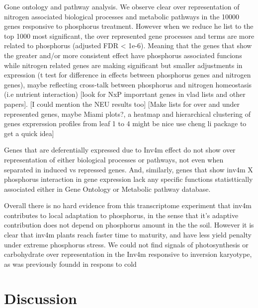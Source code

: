 Gone ontology and pathway analysis. 
We observe clear over representation of nitrogen associated biological processes and metabolic pathways in  the 10000 genes responsive to phosphorus treatment.
However when we reduce he list to the top 1000 most significant, the over represented gene processes and terms are more related to phosphorus (adjusted FDR < 1e-6). 
Meaning that the genes that show the greater and/or more consistent effect  have phosphorus associated funcions while nitrogen related genes are making significant but smaller adjustments in expression (t test for difference in effects between phosphorus genes and nitrogen genes), maybe reflecting cross-talk between phosphorus and nitrogen homeostasis (i.e nutrient interaction) \citep{torres-rodriguez2021} [look for NxP imporrtant genes in vlad lists and other papers]. [I could mention the NEU results too]
[Make lists for over and under represented genes, maybe Miami plots?, a heatmap and hierarchical clustering of genes exprerssion profiles from leaf 1 to 4 might be nice use cheng li package to get a quick idea]

Genes that are deferentially expressed  due to Inv4m effect do not show over representation of either biological processes or pathways, not even when separated in induced vs repressed genes.
And, similarly, genes that show inv4m X phosphorus interaction in gene expression lack any specific functions statisttically associated either in Gene Ontology or Metabolic pathway database.

Overall there is no hard evidence from this transcriptome experiment that inv4m contributes to local adaptation to phosphorus, in the sense that it's adaptive contribution does not depend on phosphorus amount in the the soil.
However it is clear that inv4m plants reach faster time to maturity, and have less yield penalty under extreme phosphorus stress.
We could not find signals of photosynthesis or carbohydrate over representation in the Inv4m responsive to inversion karyotype, as was previously foundd in respons to cold \citep{crow2020}

\section{Discussion}
\printbibliography[heading=subbibintoc, title=References]

